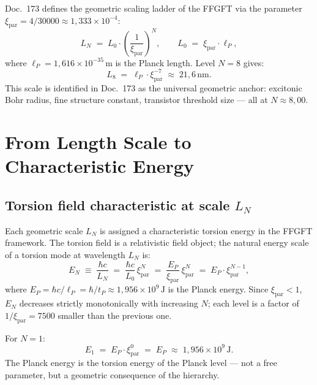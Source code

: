 	Doc.~173 defines the geometric scaling ladder of the FFGFT
	via the parameter $\xi_\text{par} = 4/30000 \approx 1{,}333\times10^{-4}$:
	\begin{equation}
		L_N \;=\; L_0 \cdot \left(\frac{1}{\xi_\text{par}}\right)^{\!N},
		\qquad L_0 \;=\; \xi_\text{par}\cdot \ell_P,
		\label{eq:length-hierarchy}
	\end{equation}
	where $\ell_P = 1{,}616\times10^{-35}\,\text{m}$ is the Planck length.
	Level $N=8$ gives:
	\begin{equation}
		L_8 \;=\; \ell_P\cdot\xi_\text{par}^{-7}
		\;\approx\; 21{,}6\,\text{nm}.
		\label{eq:L8}
	\end{equation}
	This scale is identified in Doc.~173 as the universal geometric anchor:
	excitonic Bohr radius, fine structure constant,
	transistor threshold size --- all at $N \approx 8{,}00$.
	
	\section{From Length Scale to Characteristic Energy}
	\label{sec:energy-derivation}
	
	\subsection{Torsion field characteristic at scale
		\texorpdfstring{$L_N$}{L\_N}}
	\label{subsec:torsion-energy}
	
	Each geometric scale $L_N$ is assigned a characteristic
	torsion energy in the FFGFT framework. The torsion field is a relativistic
	field object; the natural energy scale of a torsion mode at
	wavelength $L_N$ is:
	\begin{equation}
		E_N \;\equiv\; \frac{\hbar c}{L_N}
		\;=\; \frac{\hbar c}{L_0}\,\xi_\text{par}^{N}
		\;=\; \frac{E_P}{\xi_\text{par}}\,\xi_\text{par}^{N}
		\;=\; E_P\cdot\xi_\text{par}^{N-1},
		\label{eq:energy-hierarchy}
	\end{equation}
	where $E_P = \hbar c/\ell_P = \hbar/t_P \approx 1{,}956\times10^9\,\text{J}$
	is the Planck energy. Since $\xi_\text{par} < 1$, $E_N$ decreases strictly
	monotonically with increasing $N$; each level is a factor of
	$1/\xi_\text{par} = 7500$ smaller than the previous one.
	
	\begin{keyresult}[Verification: $N=1$ yields the Planck energy]
		For $N = 1$:
		\begin{equation}
			E_1 \;=\; E_P \cdot \xi_\text{par}^{0} \;=\; E_P
			\;\approx\; 1{,}956\times10^9\,\text{J}.
		\end{equation}
		The Planck energy is the torsion energy of the Planck level --- not a
		free parameter, but a geometric consequence of the hierarchy.
	\end{keyresult}
	
